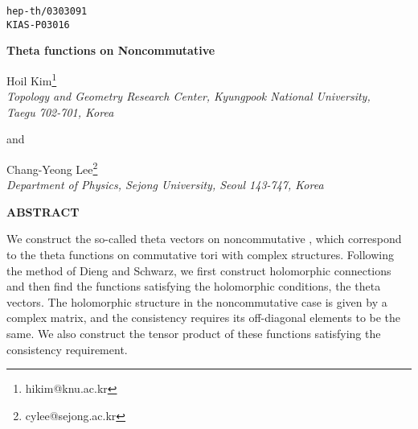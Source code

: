 \documentclass[12pt, a4paper]{article}
\begin{document}
\topmargin -2pt


\headheight 0pt

\topskip 0mm \addtolength{\baselineskip}{0.20\baselineskip}
\begin{flushright}
{\tt hep-th/0303091} \\
{\tt KIAS-P03016}
\end{flushright}

\vspace{10mm}


\begin{center}
{\large \bf   Theta functions on Noncommutative \coordHE{} }\\

\vspace{9mm}

{\sc Hoil Kim}\footnote{hikim@knu.ac.kr}\\

{\it Topology and Geometry Research Center, Kyungpook National University,\\
Taegu 702-701, Korea}\\

\vspace{3mm}

and \\

\vspace{3mm}

{\sc Chang-Yeong Lee}\footnote{cylee@sejong.ac.kr}\\
{\it Department of Physics, Sejong University, Seoul 143-747, Korea}\\

\vspace{18mm}


\end{center}


\begin{center}
{\bf ABSTRACT}
\end{center}
We construct the so-called theta vectors on noncommutative \coordHE{},
which correspond to the theta functions on commutative tori with
complex structures. Following the method of Dieng and Schwarz, we
first construct holomorphic connections and then find the
functions satisfying the holomorphic conditions, the theta
vectors. The holomorphic structure in the noncommutative \coordHE{}
case is given by a \coordHE{} complex matrix, and the
consistency requires its off-diagonal elements to be the same. We
also construct the tensor product of these functions
satisfying the consistency requirement.\\
\end{document}
